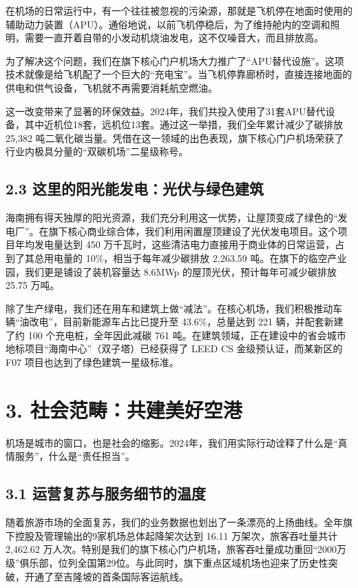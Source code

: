 \documentclass[a4paper,12pt]{article}
\begin{document}
在机场的日常运行中，有一个往往被忽视的污染源，那就是飞机停在地面时使用的辅助动力装置（APU）。通俗地说，以前飞机停稳后，为了维持舱内的空调和照明，需要一直开着自带的小发动机烧油发电，这不仅噪音大，而且排放高。

为了解决这个问题，我们在旗下核心门户机场大力推广了“APU替代设施”。这项技术就像是给飞机配了一个巨大的“充电宝”。当飞机停靠廊桥时，直接连接地面的供电和供气设备，飞机就不再需要消耗航空燃油。

这一改变带来了显著的环保效益。2024年，我们共投入使用了31套APU替代设备，其中近机位18套，远机位13套。通过这一举措，我们全年累计减少了碳排放 25,382 吨二氧化碳当量。凭借在这一领域的出色表现，旗下核心门户机场荣获了行业内极具分量的“双碳机场”二星级称号。

\subsection{2.3 这里的阳光能发电：光伏与绿色建筑}

海南拥有得天独厚的阳光资源，我们充分利用这一优势，让屋顶变成了绿色的“发电厂”。在旗下核心商业综合体，我们利用闲置屋顶建设了光伏发电项目。这个项目年均发电量达到 450 万千瓦时，这些清洁电力直接用于商业体的日常运营，占到了其总用电量的 10\%，相当于每年减少碳排放 2,263.59 吨。在旗下的临空产业园，我们更是铺设了装机容量达 8.6MWp 的屋顶光伏，预计每年可减少碳排放 25.75 万吨。

除了生产绿电，我们还在用车和建筑上做“减法”。在核心机场，我们积极推动车辆“油改电”，目前新能源车占比已提升至 43.6\%，总量达到 221 辆，并配套新建了约 100 个充电桩，全年因此减碳 761 吨。在建筑领域，正在建设中的省会城市地标项目“海南中心”（双子塔）已经获得了 LEED CS 金级预认证，而某新区的 F07 项目也达到了绿色建筑一星级标准。

\section{3. 社会范畴：共建美好空港}

机场是城市的窗口，也是社会的缩影。2024年，我们用实际行动诠释了什么是“真情服务”，什么是“责任担当”。

\subsection{3.1 运营复苏与服务细节的温度}

随着旅游市场的全面复苏，我们的业务数据也划出了一条漂亮的上扬曲线。全年旗下控股及管理输出的9家机场总体起降架次达到 16.11 万架次，旅客吞吐量共计 2,462.62 万人次。特别是我们的旗下核心门户机场，旅客吞吐量成功重回“2000万级”俱乐部，位列全国第29位。与此同时，旗下重点区域机场也迎来了历史性突破，开通了至吉隆坡的首条国际客运航线。
\end{document}
